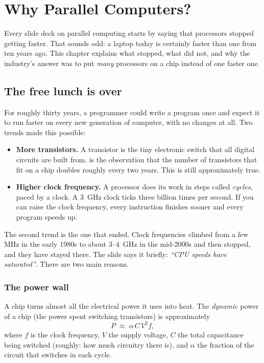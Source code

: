 \chapter{Why Parallel Computers?}
\label{ch:why}


Every slide deck on parallel computing starts by saying that processors stopped getting faster.
That sounds odd: a laptop today is certainly faster than one from ten years ago. This chapter
explains what stopped, what did not, and why the industry's answer was to put \emph{many} processors on a chip
instead of one faster one.

\section{The free lunch is over}

For roughly thirty years, a programmer could write a program once and expect it to run faster on
every new generation of computer, with no changes at all. Two trends made this possible:

\begin{itemize}
  \item \textbf{More transistors.} A transistor is the tiny electronic switch that all digital
        circuits are built from.  is the observation that the number of
        transistors that fit on a chip doubles roughly every two years. This is still
        approximately true.
  \item \textbf{Higher clock frequency.} A processor does its work in steps called
        \emph{cycles}, paced by a clock. A $3$~GHz clock ticks three billion times per second.
        If you can raise the clock frequency, every instruction finishes sooner and every program speeds up.
\end{itemize}

The second trend is the one that ended. Clock frequencies climbed from a few MHz in the early
1980s to about $3$--$4$~GHz in the mid-2000s and then stopped, and they have stayed there. The
slide says it briefly: \emph{``CPU speeds have saturated''}. There are two main reasons.

\subsection{The power wall}

A chip turns almost all the electrical power it uses into heat. The \emph{dynamic} power of a
chip (the power spent switching transistors) is approximately
\begin{equation}
  P \;\approx\; \alpha\, C\, V^{2} f ,
  \label{eq:power}
\end{equation}
where $f$ is the clock frequency, $V$ the supply voltage, $C$ the total capacitance being
switched (roughly: how much circuitry there is), and $\alpha$ the fraction of the circuit that
switches in each cycle.

